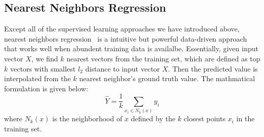 \subsection{Nearest Neighbors Regression}
\label{sub:nearest_neighbor}
Except all of the supervised learning approaches we have introduced above, nearest neighbors regression~\cite{hardle1990} is a intuitive but powerful data-driven approach that works well when abundent training data is availalbe.
Essentially, given input vector $X$, we find $k$ nearest vectors from the training set, which are defined as top $k$ vectors with smallest $l_2$ distance to input vector $X$.
Then the predicted value is interpolated from the $k$ nearest neighbor's ground truth value. 
The mathmatical formulation is given below:
\begin{equation}
	\hat{Y} = \frac{1}{k} \sum \limits_{x_i \in N_k(x)} y_i
\end{equation}
where $N_k(x)$ is the neighborhood of $x$ defined by the $k$ closest points $x_i$ in the training set.
